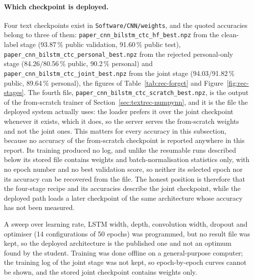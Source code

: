 \paragraph{Which checkpoint is deployed.}
Four text checkpoints exist in \texttt{Software/CNN/weights}, and the quoted accuracies belong to three of them: \texttt{paper\_cnn\_bilstm\_ctc\_hf\_best.npz} from the clean-label stage (93.87\,\% public validation, 91.60\,\% public test), \texttt{paper\_cnn\_bilstm\_ctc\_personal\_best.npz} from the rejected personal-only stage (84.26/80.56\,\% public, 90.2\,\% personal) and \texttt{paper\_cnn\_bilstm\_ctc\_joint\_best.npz} from the joint stage (94.03/91.82\,\% public, 89.64\,\% personal), the figures of Table~\ref{tab:rec-forget} and Figure~\ref{fig:rec-stages}.
The fourth file, \texttt{paper\_cnn\_bilstm\_ctc\_scratch\_best.npz}, is the output of the from-scratch trainer of Section~\ref{sec:textrec-numpynn}, and it is the file the deployed system actually uses: the loader prefers it over the joint checkpoint whenever it exists, which it does, so the server serves the from-scratch weights and not the joint ones.
This matters for every accuracy in this subsection, because no accuracy of the from-scratch checkpoint is reported anywhere in this report.
Its training produced no log, and unlike the resumable runs described below its stored file contains weights and batch-normalisation statistics only, with no epoch number and no best validation score, so neither its selected epoch nor its accuracy can be recovered from the file.
The honest position is therefore that the four-stage recipe and its accuracies describe the joint checkpoint, while the deployed path loads a later checkpoint of the same architecture whose accuracy has not been measured.

A sweep over learning rate, LSTM width, depth, convolution width, dropout and optimiser (14 configurations of 50 epochs) was programmed, but no result file was kept, so the deployed architecture is the published one and not an optimum found by the student.
Training was done offline on a general-purpose computer; the training log of the joint stage was not kept, so epoch-by-epoch curves cannot be shown, and the stored joint checkpoint contains weights only.

